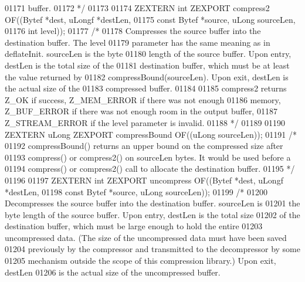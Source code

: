 \begin{DoxyCode}
01171 \textcolor{comment}{   buffer.}
01172 \textcolor{comment}{*/}
01173 
01174 ZEXTERN \textcolor{keywordtype}{int} ZEXPORT compress2 OF((Bytef *dest,   uLongf *destLen,
01175                                   \textcolor{keyword}{const} Bytef *source, uLong sourceLen,
01176                                   \textcolor{keywordtype}{int} level));
01177 \textcolor{comment}{/*}
01178 \textcolor{comment}{     Compresses the source buffer into the destination buffer.  The level}
01179 \textcolor{comment}{   parameter has the same meaning as in deflateInit.  sourceLen is the byte}
01180 \textcolor{comment}{   length of the source buffer.  Upon entry, destLen is the total size of the}
01181 \textcolor{comment}{   destination buffer, which must be at least the value returned by}
01182 \textcolor{comment}{   compressBound(sourceLen).  Upon exit, destLen is the actual size of the}
01183 \textcolor{comment}{   compressed buffer.}
01184 \textcolor{comment}{}
01185 \textcolor{comment}{     compress2 returns Z\_OK if success, Z\_MEM\_ERROR if there was not enough}
01186 \textcolor{comment}{   memory, Z\_BUF\_ERROR if there was not enough room in the output buffer,}
01187 \textcolor{comment}{   Z\_STREAM\_ERROR if the level parameter is invalid.}
01188 \textcolor{comment}{*/}
01189 
01190 ZEXTERN uLong ZEXPORT compressBound OF((uLong sourceLen));
01191 \textcolor{comment}{/*}
01192 \textcolor{comment}{     compressBound() returns an upper bound on the compressed size after}
01193 \textcolor{comment}{   compress() or compress2() on sourceLen bytes.  It would be used before a}
01194 \textcolor{comment}{   compress() or compress2() call to allocate the destination buffer.}
01195 \textcolor{comment}{*/}
01196 
01197 ZEXTERN \textcolor{keywordtype}{int} ZEXPORT uncompress OF((Bytef *dest,   uLongf *destLen,
01198                                    \textcolor{keyword}{const} Bytef *source, uLong sourceLen));
01199 \textcolor{comment}{/*}
01200 \textcolor{comment}{     Decompresses the source buffer into the destination buffer.  sourceLen is}
01201 \textcolor{comment}{   the byte length of the source buffer.  Upon entry, destLen is the total size}
01202 \textcolor{comment}{   of the destination buffer, which must be large enough to hold the entire}
01203 \textcolor{comment}{   uncompressed data.  (The size of the uncompressed data must have been saved}
01204 \textcolor{comment}{   previously by the compressor and transmitted to the decompressor by some}
01205 \textcolor{comment}{   mechanism outside the scope of this compression library.) Upon exit, destLen}
01206 \textcolor{comment}{   is the actual size of the uncompressed buffer.}

\end{DoxyCode}
